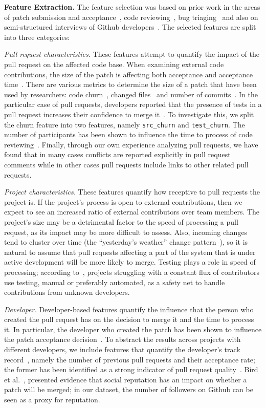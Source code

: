 \documentclass{sig-alternate}
\begin{document}
\textbf{Feature Extraction.} The feature selection was based on prior work in the areas of patch submission and acceptance~\cite{Nagap05,Bird07a,Weiss08,Baysa12}, 
code reviewing~\cite{Rigby13}, bug
triaging~\cite{Anvik06, Giger10} and also on semi-structured interviews of
Github developers~\cite{Dabbi12, Pham13, McDon13}. The selected features are split
into three categories:

  \emph{Pull request characteristics.} These features attempt to quantify the
  impact of the pull request on the affected code base. When examining external
  code contributions, the size of the patch is affecting both acceptance and
  acceptance time~\cite{Weiss08}. There are various metrics to determine the
  size of a patch that have been used by researchers: code churn~\cite{Nagap05,
  Ratzi07}, changed files~\cite{Nagap05} and number of commits~\cite{Fluri07}.
  In the particular case of pull requests, developers reported that the presence
  of tests in a pull request increases their confidence to merge
  it~\cite{Pham13}. To investigate this, we split the churn feature into two
  features, namely \texttt{src\_churn} and \texttt{test\_churn}. The
  number of participants has been shown to influence the time to process of code
  reviewing~\cite{Rigby13}. Finally, through our own experience analyzing pull
  requests, we have found that in many cases conflicts are reported explicitly
  in pull request comments while in other cases pull requests include links to
  other related pull requests.

  \emph{Project characteristics.} These features quantify how receptive to pull
  requests the project is. If the project's process is open to external
  contributions, then we expect to see an increased ratio of external
  contributors over team members. The project's size may be a detrimental factor
  to the speed of processing a pull request, as its impact may be more difficult
  to assess. Also, incoming changes tend to cluster over time (the ``yesterday's
  weather'' change pattern~\cite{Girba04}), so it is natural to assume that pull
  requests affecting a part of the system that is under active development will
  be more likely to merge. Testing plays a role in speed of processing;
  according to~\cite{Pham13}, projects struggling with a constant flux of
  contributors use testing, manual or preferably automated, as a safety net to
  handle contributions from unknown developers.

  \emph{Developer.}  Developer-based features quantify the influence that the
  person who created the pull request has on the decision to merge it and the
  time to process it. In particular, the developer who created the patch has
  been shown to influence the patch acceptance decision~\cite{Jeong09}. To
  abstract the results across projects with different developers, we include
  features that quantify the developer's track record~\cite{Dabbi12}, namely the
  number of previous pull requests and their acceptance rate; the former has
  been identified as a strong indicator of pull request quality~\cite{Pham13}.
  Bird et al.~\cite{Bird07}, presented evidence that social reputation has an
  impact on whether a patch will be merged; in our dataset, the number of
  followers on Github can be seen as a proxy for reputation.
\end{document}

